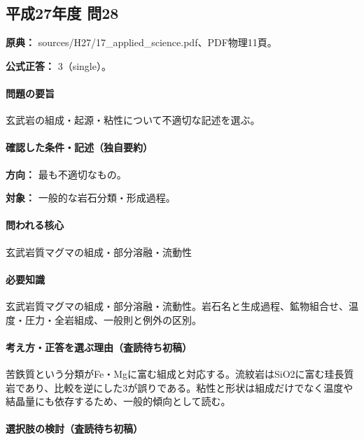\subsection{平成27年度 問28}
\label{q:h27-reg-applied-28}

\noindent\textbf{原典：} sources/H27/17\_applied\_science.pdf、PDF物理11頁。

\textbf{公式正答：} 3（single）。

\paragraph{問題の要旨} 玄武岩の組成・起源・粘性について不適切な記述を選ぶ。

\paragraph{確認した条件・記述（独自要約）}\mbox{}\par

\noindent\textbf{方向：} 最も不適切なもの。\par

\noindent\textbf{対象：} 一般的な岩石分類・形成過程。\par

\paragraph{問われる核心} 玄武岩質マグマの組成・部分溶融・流動性

\paragraph{必要知識} 玄武岩質マグマの組成・部分溶融・流動性。岩石名と生成過程、鉱物組合せ、温度・圧力・全岩組成、一般則と例外の区別。

\paragraph{考え方・正答を選ぶ理由（査読待ち初稿）} 苦鉄質という分類がFe・Mgに富む組成と対応する。流紋岩はSiO2に富む珪長質岩であり、比較を逆にした3が誤りである。粘性と形状は組成だけでなく温度や結晶量にも依存するため、一般的傾向として読む。

\paragraph{選択肢の検討（査読待ち初稿）}\mbox{}\par

